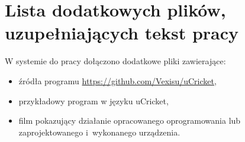 \chapter{Lista dodatkowych plików, uzupełniających tekst pracy} 


W systemie do pracy dołączono dodatkowe pliki zawierające:
\begin{itemize}
\item źródła programu \url{https://github.com/Vexisu/uCricket},
\item przykładowy program w języku uCricket,
\item film pokazujący działanie opracowanego oprogramowania lub zaprojektowanego i~wykonanego urządzenia.
\end{itemize}
